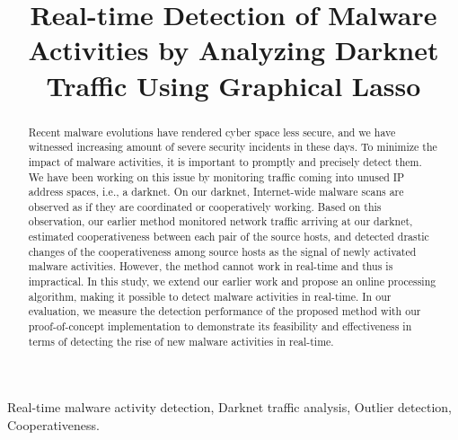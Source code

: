 \documentclass[conference]{IEEEtran}
\begin{document}
\title{
  Real-time Detection of Malware Activities by Analyzing Darknet Traffic Using Graphical Lasso
}

\author{
}


\maketitle

\begin{abstract}
Recent malware evolutions have rendered cyber space less secure, and we have witnessed increasing amount of severe security incidents in these days.
To minimize the impact of malware activities, it is important to promptly and precisely detect them.
We have been working on this issue by monitoring traffic coming into unused IP address spaces, i.e., a darknet.
On our darknet, Internet-wide malware scans are observed as if they are coordinated or cooperatively working.
Based on this observation, our earlier method monitored network traffic arriving at our darknet, estimated cooperativeness between each pair of the source hosts, and detected drastic changes of the cooperativeness among source hosts as the signal of newly activated malware activities.
However, the method cannot work in real-time and thus is impractical.
In this study, we extend our earlier work and propose an online processing algorithm, making it possible to detect malware activities in real-time.
In our evaluation, we measure the detection performance of the proposed method with our proof-of-concept implementation to demonstrate its feasibility and effectiveness in terms of detecting the rise of new malware activities in real-time.
\end{abstract}

\begin{IEEEkeywords}
Real-time malware activity detection, Darknet traffic analysis, Outlier detection, Cooperativeness.
\end{IEEEkeywords}
\end{document}
